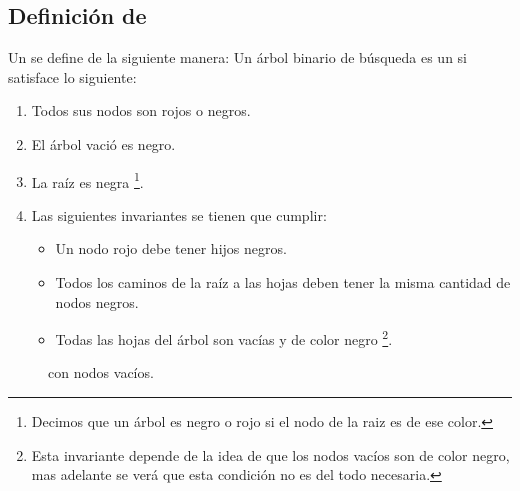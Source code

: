 \subsection{Definici\'on de {\arns}}
Un {\arn} se define de la siguiente manera:
Un \'arbol binario de búsqueda es un {\arn} si satisface lo siguiente:
\begin{enumerate}
    \item Todos sus nodos son rojos o negros.
    \item El \'arbol vació es negro.
    \item La raíz es negra \footnote{Decimos que un \'arbol es negro o rojo si el nodo de la raiz
    es de ese color.}.
    \item Las siguientes invariantes se tienen que cumplir:
    \begin{itemize}
        \item Un nodo rojo debe tener hijos negros.
        \item Todos los caminos de la raíz a las hojas deben tener la misma cantidad de nodos
        negros.
        \item Todas las hojas del \'arbol son vacías y de color negro \footnote{Esta invariante
        depende de la idea de que los nodos vacíos son de color negro, mas adelante se ver\'a que
        esta condici\'on no es del todo necesaria.}.
    \end{itemize}
\end{enumerate}

\begin{figure}
\centering
\captionsetup{justification=centering}
\caption {\Arn con nodos vac\'ios.}
\label{arbolRB_1}
\end{figure}

